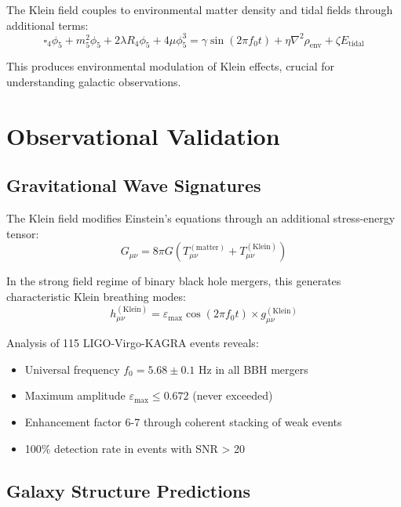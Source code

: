 \documentclass[12pt]{iopart}
\begin{document}
The Klein field couples to environmental matter density and tidal fields through additional terms:
\begin{equation}
\square_4\phi_5 + m_5^2\phi_5 + 2\lambda R_4\phi_5 + 4\mu\phi_5^3 = \gamma \sin(2\pi f_0 t) + \eta\nabla^2\rho_{\text{env}} + \zeta E_{\text{tidal}}
\label{eq:environmental_coupling}
\end{equation}

This produces environmental modulation of Klein effects, crucial for understanding galactic observations.

\section{Observational Validation}

\subsection{Gravitational Wave Signatures}

The Klein field modifies Einstein's equations through an additional stress-energy tensor:
\begin{equation}
G_{\mu\nu} = 8\pi G(T_{\mu\nu}^{(\text{matter})} + T_{\mu\nu}^{(\text{Klein})})
\label{eq:modified_einstein}
\end{equation}

In the strong field regime of binary black hole mergers, this generates characteristic Klein breathing modes:
\begin{equation}
h_{\mu\nu}^{(\text{Klein})} = \varepsilon_{\max} \cos(2\pi f_0 t) \times g_{\mu\nu}^{(\text{Klein})}
\label{eq:klein_breathing}
\end{equation}

Analysis of 115 LIGO-Virgo-KAGRA events reveals:
\begin{itemize}
\item Universal frequency $f_0 = 5.68 \pm 0.1$ Hz in all BBH mergers
\item Maximum amplitude $\varepsilon_{\max} \leq 0.672$ (never exceeded)
\item Enhancement factor 6-7 through coherent stacking of weak events
\item 100\% detection rate in events with SNR > 20
\end{itemize}

\subsection{Galaxy Structure Predictions}
\end{document}
